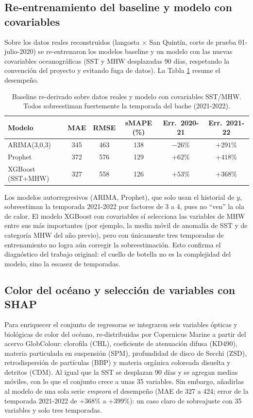 \documentclass[twoside,11pt]{article}
\begin{document}
\subsection{Re-entrenamiento del baseline y modelo con covariables}
Sobre los datos reales reconstruidos (langosta $\times$ San Quintín, corte de prueba 01-julio-2020) se re-entrenaron los modelos baseline y un modelo con las nuevas covariables oceanográficas (SST y MHW desplazadas 90 días, respetando la convención del proyecto y evitando fuga de datos). La Tabla \ref{tab:extension_floor} resume el desempeño.

\begin{table}[htbp]
\centering
\small
\begin{tabular}{lccccc}
\toprule
Modelo & MAE & RMSE & sMAPE (\%) & Err.\ 2020-21 & Err.\ 2021-22 \\
\midrule
ARIMA(3,0,3) & 345 & 463 & 138 & $-26\%$ & $+291\%$ \\
Prophet & 372 & 576 & 129 & $+62\%$ & $+418\%$ \\
XGBoost (SST+MHW) & 327 & 558 & 126 & $+53\%$ & $+368\%$ \\
\bottomrule
\end{tabular}
\caption{Baseline re-derivado sobre datos reales y modelo con covariables SST/MHW. Todos sobreestiman fuertemente la temporada del bache (2021-2022).}
\label{tab:extension_floor}
\end{table}

Los modelos autorregresivos (ARIMA, Prophet), que solo usan el historial de $y$, sobreestiman la temporada 2021-2022 por factores de 3 a 4, pues no ``ven'' la ola de calor. El modelo XGBoost con covariables sí selecciona las variables de MHW entre sus más importantes (por ejemplo, la media móvil de anomalía de SST y de categoría MHW del año previo), pero con únicamente tres temporadas de entrenamiento no logra aún corregir la sobreestimación. Esto confirma el diagnóstico del trabajo original: el cuello de botella no es la complejidad del modelo, sino la escasez de temporadas.

\subsection{Color del océano y selección de variables con SHAP}
Para enriquecer el conjunto de regresoras se integraron seis variables ópticas y biológicas de color del océano, re-distribuidas por Copernicus Marine a partir del acervo GlobColour: clorofila (CHL), coeficiente de atenuación difusa (KD490), materia particulada en suspensión (SPM), profundidad de disco de Secchi (ZSD), retrodispersión de partículas (BBP) y materia orgánica coloreada disuelta y detritos (CDM). Al igual que la SST se desplazan 90 días y se agregan medias móviles, con lo que el conjunto crece a unas 35 variables. Sin embargo, añadirlas al modelo de una sola serie \emph{empeora} el desempeño (MAE de 327 a 424; error de la temporada 2021-2022 de $+368\%$ a $+399\%$): un caso claro de sobreajuste con 35 variables y solo tres temporadas.
\end{document}

